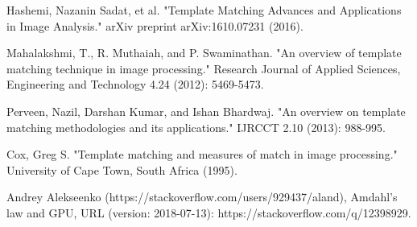 \cleardoublepage
{}
{}
\begin{thebibliography}{99}

Hashemi, Nazanin Sadat, et al. "Template Matching Advances and Applications in Image Analysis." arXiv preprint arXiv:1610.07231 (2016).


Mahalakshmi, T., R. Muthaiah, and P. Swaminathan. "An overview of template matching technique in image processing." Research Journal of Applied Sciences, Engineering and Technology 4.24 (2012): 5469-5473.

Perveen, Nazil, Darshan Kumar, and Ishan Bhardwaj. "An overview on template matching methodologies and its applications." IJRCCT 2.10 (2013): 988-995.

Cox, Greg S. "Template matching and measures of match in image processing." University of Cape Town, South Africa (1995).

Andrey Alekseenko (https://stackoverflow.com/users/929437/aland), Amdahl's law and GPU, URL (version: 2018-07-13): https://stackoverflow.com/q/12398929.

\end{thebibliography}
